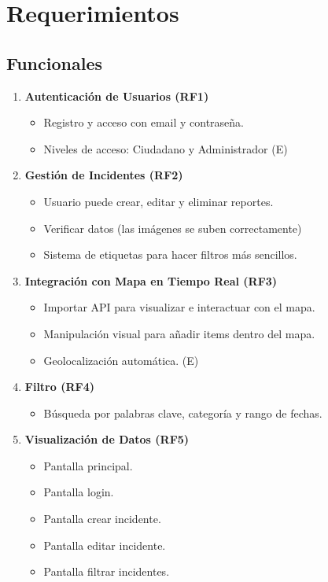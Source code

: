 \section{Requerimientos}

\subsection*{Funcionales}

\begin{enumerate}
    \item \textbf{Autenticación de Usuarios (RF1)}
    \begin{itemize}
        \item Registro y acceso con email y contraseña.        
        \item Niveles de acceso: Ciudadano y Administrador (E)
    \end{itemize}

    \item \textbf{Gestión de Incidentes (RF2)}
    \begin{itemize}
        \item Usuario puede crear, editar y eliminar reportes.
        \item Verificar datos (las imágenes se suben correctamente)
        \item Sistema de etiquetas para hacer filtros más sencillos.
    \end{itemize}

    \item \textbf{Integración con Mapa en Tiempo Real (RF3)}
    \begin{itemize}
        \item Importar API para visualizar e interactuar con el mapa.
        \item Manipulación visual para añadir items dentro del mapa.
        \item Geolocalización automática. (E)
    \end{itemize}

    \item \textbf{Filtro (RF4)}
    \begin{itemize}
        \item Búsqueda por palabras clave, categoría y rango de fechas.        
    \end{itemize}

    \item \textbf{Visualización de Datos (RF5)}
    \begin{itemize}
        \item Pantalla principal.
        \item Pantalla login.
        \item Pantalla crear incidente.
        \item Pantalla editar incidente.
        \item Pantalla filtrar incidentes.
    \end{itemize}
\end{enumerate}

